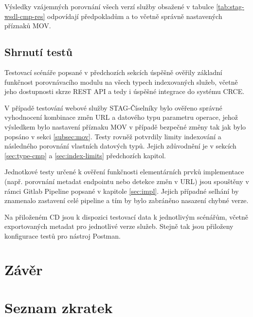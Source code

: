 \documentclass[czech,DP]{thesiskiv}
\begin{document}
Výsledky vzájemných porovnání všech verzí služby obsažené v tabulce \ref{tab:stag-wsdl-cmp-res} odpovídají předpokladům a to včetně správně nastavených příznaků MOV.

\section{Shrnutí testů}

Testovací scénáře popsané v předchozích sekcích úspěšně ověřily základní funkčnost porovnávacího modulu na všech typech indexovaných služeb, včetně jeho dostupnosti skrze REST API a tedy i úspěšné integrace do systému CRCE. 

V případě testování webové služby STAG-Číselníky bylo ověřeno správné vyhodnocení kombinace změn URL a datového typu parametru operace, jehož výsledkem bylo nastavení příznaku MOV v případě bezpečné změny tak jak bylo popsáno v sekci \ref{subsec:mov}. Testy rovněž potvrdily limity indexování a následného porovnání vlastních datových typů. Jejich zdůvodnění je v sekcích \ref{sec:type-cmp} a \ref{sec:index-limits} předchozích kapitol. 

Jednotkové testy určené k ověření funkčnosti elementárních prvků implementace (např. porovnání metadat endpointu nebo detekce změn v URL) jsou spouštěny v rámci Gitlab Pipeline popsané v kapitole \ref{sec:impl}. Jejich případné selhání by znamenalo zastavení celé pipeline a tím by bylo zabráněno nasazení chybné verze.

Na přiloženém CD jsou k dispozici testovací data k jednotlivým scénářům, včetně exportovaných metadat pro jednotlivé verze služeb. Stejně tak jsou přiloženy konfigurace testů pro nástroj Postman.


\chapter{Závěr}	

 
% 
%

{\raggedright\small

}

\chapter*{Seznam zkratek}
\end{document}
